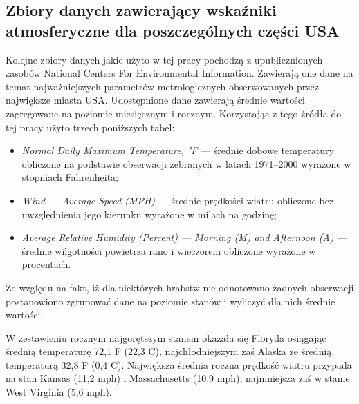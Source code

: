 \documentclass[polish, twoside, 12pt, a4paper]{article}
\theoremstyle{definition}
\theoremstyle{plain}
\theoremstyle{remark}
\begin{document}
\subsection{Zbiory danych zawierający wskaźniki atmosferyczne dla poszczególnych części USA}

Kolejne zbiory danych jakie użyto w tej pracy pochodzą z upublicznionych zasobów National Centers For Environmental Information. Zawierają one dane na temat najważniejszych parametrów metrologicznych obserwowanych przez największe miasta USA. Udostępnione dane zawierają średnie wartości zagregowane na poziomie miesięcznym i rocznym. Korzystając z tego źródła do tej pracy użyto trzech poniższych tabel:
\begin{itemize}[noitemsep]
  \item \emph{Normal Daily Maximum Temperature, °F} --- średnie dobowe temperatury obliczone na podstawie obserwacji zebranych w latach 1971--2000 wyrażone w stopniach Fahrenheita;
  \item \emph{Wind --- Average Speed (MPH)} --- średnie prędkości wiatru obliczone bez uwzględnienia jego kierunku wyrażone w milach na godzinę;
  \item \emph{Average Relative Humidity (Percent) --- Morning (M) and Afternoon (A)} --- średnie wilgotności powietrza rano i wieczorem obliczone wyrażone w procentach.
\end{itemize}

Ze względu na fakt, iż dla niektórych hrabstw nie odnotowano żadnych obserwacji postanowiono zgrupować dane na poziomie stanów i wyliczyć dla nich średnie wartości. 

W zestawieniu rocznym najgorętszym stanem okazała się Floryda osiągając średnią temperaturę 72,1 \textdegree F (22,3 \textdegree C), najchłodniejszym zaś Alaska ze średnią temperaturą 32,8 \textdegree F (0,4 \textdegree C). Największa średnia roczna prędkość wiatru przypada na stan Kansas (11,2 mph) i Massachusetts (10,9 mph), najmniejsza zaś w stanie West Virginia (5,6 mph). 
\end{document}
